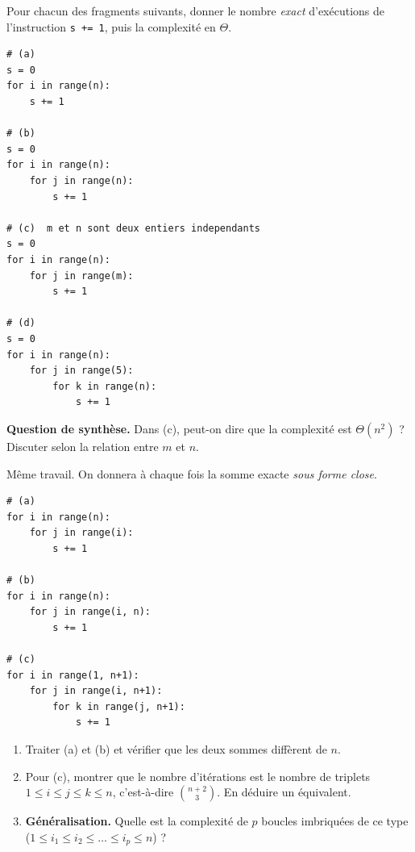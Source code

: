 \documentclass[11pt,a4paper]{article}
\begin{document}

Pour chacun des fragments suivants, donner le nombre \emph{exact} d'exécutions de
l'instruction \texttt{s += 1}, puis la complexité en $\Theta$.

\begin{lstlisting}
# (a)
s = 0
for i in range(n):
    s += 1

# (b)
s = 0
for i in range(n):
    for j in range(n):
        s += 1

# (c)  m et n sont deux entiers independants
s = 0
for i in range(n):
    for j in range(m):
        s += 1

# (d)
s = 0
for i in range(n):
    for j in range(5):
        for k in range(n):
            s += 1
\end{lstlisting}

\medskip
\textbf{Question de synthèse.} Dans (c), peut-on dire que la complexité est
$\Theta(n^2)$ ? Discuter selon la relation entre $m$ et $n$.

Même travail. On donnera à chaque fois la somme exacte \emph{sous forme close}.

\begin{lstlisting}
# (a)
for i in range(n):
    for j in range(i):
        s += 1

# (b)
for i in range(n):
    for j in range(i, n):
        s += 1

# (c)
for i in range(1, n+1):
    for j in range(i, n+1):
        for k in range(j, n+1):
            s += 1
\end{lstlisting}

\begin{enumerate}[label=\arabic*.,leftmargin=*]
  \item Traiter (a) et (b) et vérifier que les deux sommes diffèrent de $n$.
  \item Pour (c), montrer que le nombre d'itérations est le nombre de triplets
        $1\le i\le j\le k\le n$, c'est-à-dire $\binom{n+2}{3}$. En déduire un équivalent.
  \item \textbf{Généralisation.} Quelle est la complexité de $p$ boucles imbriquées
        de ce type ($1\le i_1\le i_2\le\dots\le i_p\le n$) ?
\end{enumerate}
\end{document}
